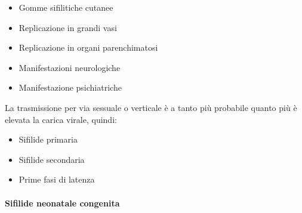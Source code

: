 \documentclass[italian,]{article}
\providecommand{\tightlist}{%
  \setlength{\itemsep}{0pt}\setlength{\parskip}{0pt}}
\newcommand{\yellowbox}[2]{\begin{tcolorbox}[title=#1,colback=yellow!5,colframe=yellow!75!red, coltitle=black]#2\end{tcolorbox}} %
\begin{document}
\begin{enumerate}
  \begin{itemize}
  \tightlist
  \item
    Gomme sifilitiche cutanee
  \item
    Replicazione in grandi vasi
  \item
    Replicazione in organi parenchimatosi
  \item
    Manifestazioni neurologiche
  \item
    Manifestazione psichiatriche
  \end{itemize}
\end{enumerate}

\yellowbox{Trasmissione durante le varie fasi}{
La trasmissione per via sessuale o verticale è a tanto più probabile quanto più è elevata la carica virale, quindi:

\begin{itemize}
\tightlist
\item Sifilide primaria
\item Sifilide secondaria
\item Prime fasi di latenza
\end{itemize}
}

\hypertarget{sifilide-neonatale-congenita}{%
\paragraph{Sifilide neonatale
congenita}\label{sifilide-neonatale-congenita}}
\end{document}
